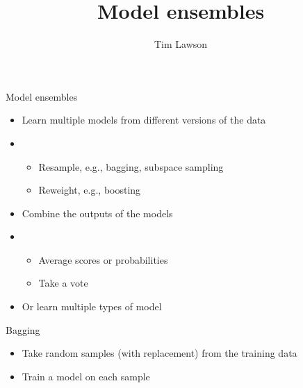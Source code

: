 \documentclass[10pt]{beamer}
\title{Model ensembles}
\author{Tim Lawson}
\begin{document}
\maketitle

\begin{frame}{Model ensembles}
  \begin{itemize}
    \item Learn multiple models from different versions of the data
    \item[]
          \begin{itemize}
            \item Resample, e.g., bagging, subspace sampling
            \item Reweight, e.g., boosting
          \end{itemize}
    \item Combine the outputs of the models
    \item[]
          \begin{itemize}
            \item Average scores or probabilities
            \item Take a vote
          \end{itemize}
    \item Or learn multiple types of model
  \end{itemize}
\end{frame}

\begin{frame}{Bagging}
  \begin{itemize}
    \item Take random samples (with replacement) from the training data
    \item Train a model on each sample
  \end{itemize}
\end{frame}
\end{document}
